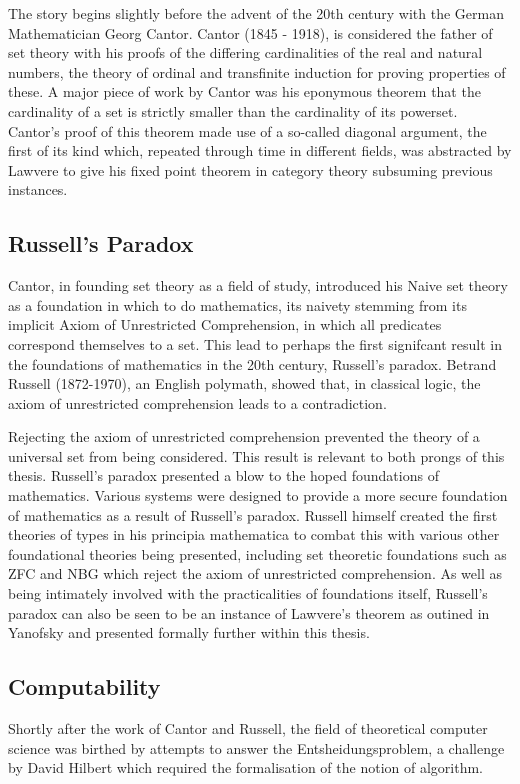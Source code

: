 The story begins slightly before the advent of the 20th century with the German
Mathematician Georg Cantor. Cantor (1845 - 1918), is considered the father of
set theory with his proofs of the differing cardinalities of the real and
natural numbers, the theory of ordinal and transfinite induction for proving
properties of these. A major piece of work by Cantor was his eponymous theorem
that the cardinality of a set is strictly smaller than the cardinality of its
powerset. Cantor's proof of this theorem made use of a so-called diagonal
argument, the first of its kind which, repeated through time in different
fields, was abstracted by Lawvere to give his fixed point theorem in category
theory subsuming previous instances.

\subsection{Russell's Paradox}
Cantor, in founding set theory as a field of study, introduced his Naive set
theory as a foundation in which to do mathematics, its naivety stemming from its
implicit Axiom of Unrestricted Comprehension, in which all predicates correspond
themselves to a set. This lead to perhaps the first signifcant result in the
foundations of mathematics in the 20th century, Russell's paradox. Betrand
Russell (1872-1970), an English polymath, showed that, in classical logic, the
axiom of unrestricted comprehension leads to a contradiction.


Rejecting the axiom of unrestricted comprehension prevented the theory of a
universal set from being considered.  This result is relevant to both prongs of
this thesis. Russell's paradox presented a blow to the hoped foundations of
mathematics. Various systems were designed to provide a more secure foundation
of mathematics as a result of Russell's paradox. Russell himself created the
first theories of types in his principia mathematica to combat this with various
other foundational theories being presented, including set theoretic foundations
such as ZFC and NBG which reject the axiom of unrestricted comprehension. As
well as being intimately involved with the practicalities of foundations itself,
Russell's paradox can also be seen to be an instance of Lawvere's theorem as
outined in Yanofsky and presented formally further within this thesis.

\subsection{Computability}
Shortly after the work of Cantor and Russell, the field of theoretical computer
science was birthed by attempts to answer the Entsheidungsproblem, a challenge
by David Hilbert which required the formalisation of the notion of algorithm.
